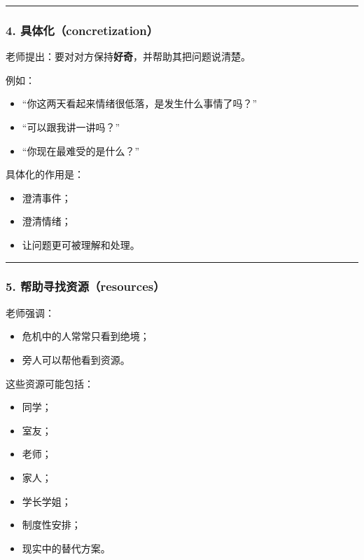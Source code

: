 \documentclass[
  chinese,
  9pt,
  a4paper,
]{ctexart}
\providecommand{\tightlist}{%
  \setlength{\itemsep}{0pt}\setlength{\parskip}{0pt}}
\begin{document}
\begin{center}\rule{0.5\linewidth}{0.5pt}\end{center}

\subsubsection{4.
具体化（concretization）}\label{ux5177ux4f53ux5316concretization}

老师提出：要对对方保持\textbf{好奇}，并帮助其把问题说清楚。

例如：

\begin{itemize}
\tightlist
\item
  ``你这两天看起来情绪很低落，是发生什么事情了吗？''
\item
  ``可以跟我讲一讲吗？''
\item
  ``你现在最难受的是什么？''
\end{itemize}

具体化的作用是：

\begin{itemize}
\tightlist
\item
  澄清事件；
\item
  澄清情绪；
\item
  让问题更可被理解和处理。
\end{itemize}

\begin{center}\rule{0.5\linewidth}{0.5pt}\end{center}

\subsubsection{5.
帮助寻找资源（resources）}\label{ux5e2eux52a9ux5bfbux627eux8d44ux6e90resources}

老师强调：

\begin{itemize}
\tightlist
\item
  危机中的人常常只看到绝境；
\item
  旁人可以帮他看到资源。
\end{itemize}

这些资源可能包括：

\begin{itemize}
\tightlist
\item
  同学；
\item
  室友；
\item
  老师；
\item
  家人；
\item
  学长学姐；
\item
  制度性安排；
\item
  现实中的替代方案。
\end{itemize}
\end{document}
